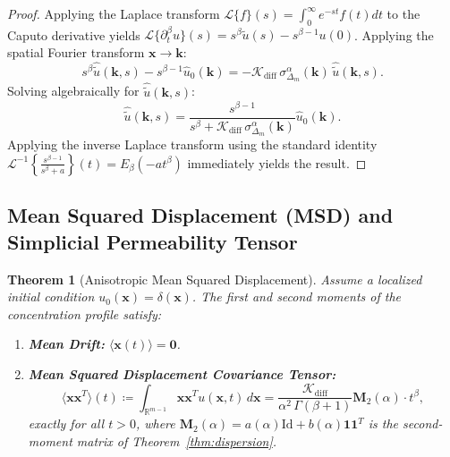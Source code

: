\documentclass[11pt,a4paper]{article}
\theoremstyle{plain}
\newtheorem{theorem}{Theorem}[section]
\theoremstyle{definition}
\theoremstyle{remark}
\numberwithin{equation}{section}
\begin{document}
\begin{proof}
Applying the Laplace transform $\mathcal{L}\{f\}(s) = \int_0^\infty e^{-st}f(t)dt$ to the Caputo derivative yields $\mathcal{L}\{\partial_t^\beta u\}(s) = s^\beta \widetilde{u}(s) - s^{\beta-1}u(0)$. Applying the spatial Fourier transform $\mathbf{x} \to \mathbf{k}$:
\begin{equation}
s^\beta \widehat{\widetilde{u}}(\mathbf{k}, s) - s^{\beta-1}\widehat{u}_0(\mathbf{k}) = -\mathcal{K}_{\text{diff}}\,\sigma_{\Delta_m}^\alpha(\mathbf{k})\,\widehat{\widetilde{u}}(\mathbf{k}, s).
\end{equation}
Solving algebraically for $\widehat{\widetilde{u}}(\mathbf{k}, s)$:
\begin{equation}
\widehat{\widetilde{u}}(\mathbf{k}, s) = \frac{s^{\beta-1}}{s^\beta + \mathcal{K}_{\text{diff}}\,\sigma_{\Delta_m}^\alpha(\mathbf{k})} \widehat{u}_0(\mathbf{k}).
\end{equation}
Applying the inverse Laplace transform using the standard identity $\mathcal{L}^{-1}\left\{\frac{s^{\beta-1}}{s^\beta + a}\right\}(t) = E_\beta(-a t^\beta)$ immediately yields the result.
\end{proof}

\subsection{Mean Squared Displacement (MSD) and Simplicial Permeability Tensor}

\begin{theorem}[Anisotropic Mean Squared Displacement]
\label{thm:msd}
Assume a localized initial condition $u_0(\mathbf{x}) = \delta(\mathbf{x})$. The first and second moments of the concentration profile satisfy:
\begin{enumerate}
    \item \textbf{Mean Drift:} $\langle \mathbf{x}(t) \rangle = \mathbf{0}$.
    \item \textbf{Mean Squared Displacement Covariance Tensor:}
    \begin{equation}
    \langle \mathbf{x} \mathbf{x}^T \rangle(t) \coloneqq \int_{\mathbb{R}^{m-1}} \mathbf{x}\mathbf{x}^T u(\mathbf{x}, t)\,d\mathbf{x} = \frac{\mathcal{K}_{\text{diff}}}{\alpha^2 \, \Gamma(\beta + 1)} \mathbf{M}_2(\alpha) \cdot t^\beta,
    \end{equation}
    exactly for all $t > 0$, where $\mathbf{M}_2(\alpha) = a(\alpha)\mathrm{Id} + b(\alpha)\mathbf{1}\mathbf{1}^T$ is the second-moment matrix of Theorem~\ref{thm:dispersion}.
\end{enumerate}
\end{theorem}
\end{document}
